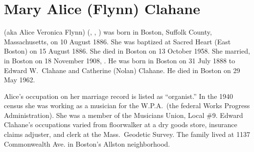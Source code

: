 \section{Mary Alice (Flynn) Clahane}\label{per:MaryAlice4Flynn}

 (aka Alice Veronica Flynn) (, , ) was born in Boston, Suffolk County, Massachusetts, on 10 August 1886.\cite{MaryAlice4FlynnBirth} She was baptized at Sacred Heart (East Boston) on 15 August 1886.\cite{MaryAlice4FlynnBaptism} She died in Boston on 13 October 1958.\cite{MaryAlice4FlynnDeath:1} She married, in Boston on 18 November 1908, .\cite{MaryAlice4FlynnMarriage:1} He was born in Boston on 31 July 1888\cite{EdwardClahaneBirth} to Edward W.\ Clahane and Catherine (Nolan) Clahane.\cite{MaryAlice4FlynnMarriage:2} He died in Boston on 29 May 1962.\cite{EdwardClahaneDeath}

Alice's occupation on her marriage record is listed as ``organist.''\cite{MaryAlice4FlynnMarriage:3} In the 1940 census she was working as a musician for the W.P.A.\ (the federal Works Progress Administration).\cite{Census1940MaryAlice4Flynn:1} She was a member of the Musicians Union, Local \#9.\cite{MaryAlice4FlynnDeath:2} Edward Clahane's occupations varied from floorwalker at a dry goods store,\cite{Census1910EdwardClahane} insurance claims adjuster,\cite{Census1920EdwardClahane} and clerk at the Mass.\ Geodetic Survey.\cite{EdwardClahaneWWIIDraft} The family lived at 1137 Commonwealth Ave. in Boston's Allston neighborhood.\cite{Census1940MaryAlice4Flynn:2}

